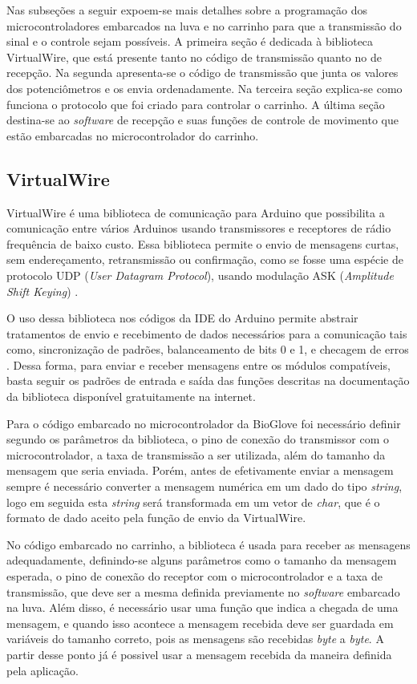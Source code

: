 \documentclass[
	12pt,				%
	openright,			%
	oneside,			%
	a4paper,			%
	english,			%
	brazil				%
	]{abntex2}
\begin{document}
		Nas subseções a seguir expoem-se mais detalhes sobre a programação dos microcontroladores embarcados na luva e no carrinho para que a transmissão do sinal e o controle sejam possíveis. A primeira seção é dedicada à biblioteca VirtualWire, que está presente tanto no código de transmissão quanto no de recepção. Na segunda apresenta-se o código de transmissão que junta os valores dos potenciômetros e os envia ordenadamente. Na terceira seção explica-se como funciona o protocolo que foi criado para controlar o carrinho. A última seção destina-se ao \textit{software} de recepção e suas funções de controle de movimento que estão embarcadas no microcontrolador do carrinho.


		\subsection{VirtualWire}


		VirtualWire é uma biblioteca de comunicação para Arduino que possibilita a comunicação entre vários Arduinos usando transmissores e receptores de rádio frequência de baixo custo. Essa biblioteca permite o envio de mensagens curtas, sem endereçamento, retransmissão ou confirmação, como se fosse uma espécie de protocolo UDP (\textit{User Datagram Protocol}), usando modulação ASK (\textit{Amplitude Shift Keying}) \cite{virtualwiremanual}. 

		O uso dessa biblioteca nos códigos da IDE do Arduino permite abstrair tratamentos de envio e recebimento de dados necessários para a comunicação tais como, sincronização de padrões, balanceamento de bits 0 e 1, e checagem de erros \cite{virtualwirepjrc}. Dessa forma, para enviar e receber mensagens entre os módulos compatíveis, basta seguir os padrões de entrada e saída das funções descritas na documentação da biblioteca disponível gratuitamente na internet.

		Para o código embarcado no microcontrolador da BioGlove foi necessário definir segundo os parâmetros da biblioteca, o pino de conexão do transmissor com o microcontrolador, a taxa de transmissão a ser utilizada, além do tamanho da mensagem que seria enviada. Porém, antes de efetivamente enviar a mensagem sempre é necessário converter a mensagem numérica em um dado do tipo \textit{string}, logo em seguida esta \textit{string} será transformada em um vetor de \textit{char}, que é o formato de dado aceito pela função de envio da VirtualWire.

		No código embarcado no carrinho, a biblioteca é usada para receber as mensagens adequadamente, definindo-se alguns parâmetros como o tamanho da mensagem esperada, o pino de conexão do receptor com o microcontrolador e a taxa de transmissão, que deve ser a mesma definida previamente no \textit{software} embarcado na luva. Além disso, é necessário usar uma função que indica a chegada de uma mensagem, e quando isso acontece a mensagem recebida deve ser guardada em variáveis do tamanho correto, pois as mensagens são recebidas \textit{byte} a \textit{byte}. A partir desse ponto já é possivel usar a mensagem recebida da maneira definida pela aplicação.
\end{document}
